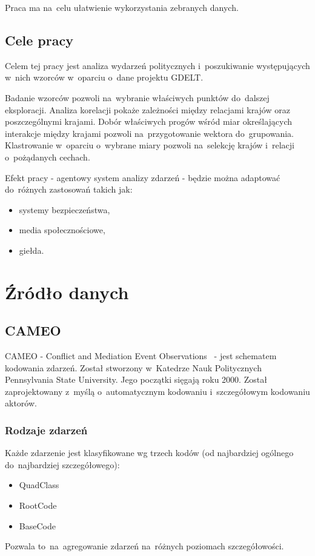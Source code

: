 \documentclass[11pt]{report}
\begin{document}
    Praca ma na~celu ułatwienie wykorzystania zebranych danych.


    \section{Cele pracy}\label{sec:cele-pracy}
    Celem tej pracy jest analiza wydarzeń politycznych i~poszukiwanie występujących w~nich wzorców w~oparciu o~dane projektu GDELT.\@

    Badanie wzorców pozwoli na~wybranie właściwych punktów do~dalszej eksploracji.
    Analiza korelacji pokaże zależności między relacjami krajów oraz poszczególnymi krajami.
    Dobór właściwych progów wśród miar określających interakcje między krajami pozwoli na~przygotowanie wektora do~grupowania.
    Klastrowanie w~oparciu o~wybrane miary pozwoli na~selekcję krajów i~relacji o~pożądanych cechach.

    Efekt pracy - agentowy system analizy zdarzeń - będzie można adaptować do~różnych zastosowań takich jak:
    \begin{itemize}
        \item systemy bezpieczeństwa,
        \item media społecznościowe,
        \item giełda.
    \end{itemize}


    \chapter{Źródło danych}\label{ch:źródło}


    \section{CAMEO}\label{sec:cameo}
    CAMEO - Conflict and Mediation Event Observations~\cite{GDELTDocumentation} - jest schematem kodowania zdarzeń.
    Został stworzony w~Katedrze Nauk Politycznych Pennsylvania State University.
    Jego początki sięgają roku 2000.
    Został zaprojektowany z~myślą o~automatycznym kodowaniu i~szczegółowym kodowaniu aktorów.

    \subsection{Rodzaje zdarzeń}
    Każde zdarzenie jest klasyfikowane wg trzech kodów (od najbardziej ogólnego do~najbardziej szczegółowego):
    \begin{itemize}
        \item QuadClass
        \item RootCode
        \item BaseCode
    \end{itemize}
    Pozwala to~na~agregowanie zdarzeń na~różnych poziomach szczegółowości.
\end{document}
